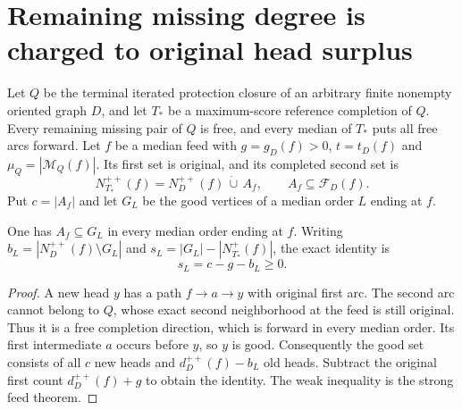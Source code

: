 \section{Remaining missing degree is charged to original head surplus}
\label{sec:closure-good-equality-missing-degree}

Let $Q$ be the terminal iterated protection closure of an arbitrary
finite nonempty oriented graph $D$, and let $T_*$ be a maximum-score
reference completion of $Q$. Every remaining missing pair of $Q$ is
free, and every median of $T_*$ puts all free arcs forward.
Let $f$ be a median feed with $g=g_D(f)>0$,
$t=t_D(f)$ and $\mu_Q=|\mathcal M_Q(f)|$. Its first set is original,
and its completed second set is
\[
 N_{T_*}^{++}(f)=N_D^{++}(f)\,\dot\cup\,A_f,
 \qquad A_f\subseteq\mathcal F_D(f).
\]
Put $c=|A_f|$ and let $G_L$ be the good vertices of a median order
$L$ ending at $f$.

\begin{lemma}
\label{lem:closure-new-head-good}
One has $A_f\subseteq G_L$ in every median order ending at $f$.
Writing
$b_L=|N_D^{++}(f)\setminus G_L|$ and
$s_L=|G_L|-|N_{T_*}^+(f)|$, the exact identity is
\[
 s_L=c-g-b_L\ge0.
\]
\end{lemma}
\begin{proof}
A new head $y$ has a path $f\to a\to y$ with original first arc.
The second arc cannot belong to $Q$, whose exact second neighborhood
at the feed is still original. Thus it is a free completion direction,
which is forward in every median order. Its first intermediate $a$
occurs before $y$, so $y$ is good. Consequently the good set consists
of all $c$ new heads and $d_D^{++}(f)-b_L$ old heads. Subtract the
original first count $d_D^{++}(f)+g$ to obtain the identity. The weak
inequality is the strong feed theorem.
\end{proof}

